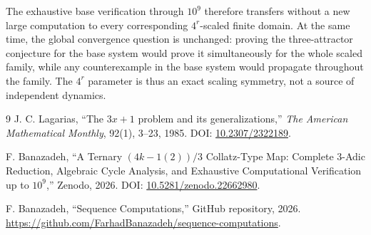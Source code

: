 \documentclass[11pt]{article}
\begin{document}
The exhaustive base verification through $10^9$ therefore transfers without a new large computation to every corresponding $4^r$-scaled finite domain. At the same time, the global convergence question is unchanged: proving the three-attractor conjecture for the base system would prove it simultaneously for the whole scaled family, while any counterexample in the base system would propagate throughout the family. The $4^r$ parameter is thus an exact scaling symmetry, not a source of independent dynamics.

\begin{thebibliography}{9}
J. C. Lagarias,
``The $3x+1$ problem and its generalizations,''
\emph{The American Mathematical Monthly}, 92(1), 3--23, 1985.
DOI: \href{https://doi.org/10.2307/2322189}{10.2307/2322189}.

F. Banazadeh,
``A Ternary $(4k-1(2))/3$ Collatz-Type Map: Complete 3-Adic Reduction, Algebraic Cycle Analysis, and Exhaustive Computational Verification up to $10^9$,''
Zenodo, 2026.
DOI: \href{https://doi.org/10.5281/zenodo.22662980}{10.5281/zenodo.22662980}.

F. Banazadeh,
``Sequence Computations,'' GitHub repository, 2026.
\url{https://github.com/FarhadBanazadeh/sequence-computations}.
\end{thebibliography}
\end{document}
